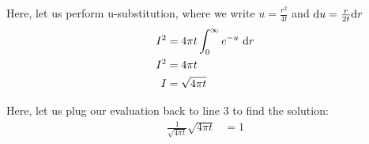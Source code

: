 Here, let us perform u-substitution, where we write
$u = \frac{r^2}{4t}$ and $\text du = \frac{r}{2t} \text dr$
%
\begin{align}
  I^2
  & = 4 \pi t \int^\infty_0
      e^{-u} \ \text dr\\
  I^2 & = 4 \pi t\\
  I & = \sqrt{4 \pi t}
\end{align}

Here, let us plug our evaluation back to line 3 to find the solution:
%
\begin{align}
  \frac{1}{\sqrt{4 \pi t}} \sqrt{4 \pi t} & = 1
\end{align}
